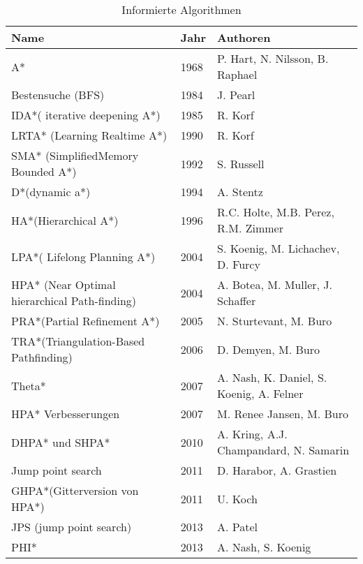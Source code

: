 \begin{table}[]
	\begin{tabular}{|l|l|l|}
		\hline
		\textbf{Name}                                          & \textbf{Jahr} & \textbf{Authoren}                                 \\ \hline
		A*                                            & 1968 & P. Hart, N. Nilsson, B. Raphael          \\ \hline
		Bestensuche (BFS)                            & 1984 & J. Pearl                                 \\ \hline
		IDA*( iterative deepening A*)                 & 1985 & R. Korf                                  \\ \hline
		LRTA* (Learning Realtime A*)                  & 1990 & R. Korf                                  \\ \hline
		SMA* (SimplifiedMemory Bounded A*)            & 1992 & S. Russell                               \\ \hline
		D*(dynamic a*)                                & 1994 & A. Stentz                                \\ \hline
		HA*(Hierarchical A*)                          & 1996 & R.C. Holte, M.B. Perez, R.M. Zimmer      \\ \hline
		LPA*( Lifelong Planning A*)                   & 2004 & S. Koenig, M. Lichachev, D. Furcy        \\ \hline
		HPA* (Near Optimal hierarchical Path-finding) & 2004 & A. Botea, M. Muller, J. Schaffer         \\ \hline
		PRA*(Partial Refinement A*)                   & 2005 & N. Sturtevant, M. Buro                   \\ \hline
		TRA*(Triangulation-Based Pathfinding)         & 2006 & D. Demyen, M. Buro                       \\ \hline
		Theta*                                        & 2007 & A. Nash, K. Daniel, S. Koenig, A. Felner \\ \hline
		HPA* Verbesserungen                           & 2007 & M. Renee Jansen, M. Buro                 \\ \hline
		DHPA* und SHPA*                               & 2010 & A. Kring, A.J. Champandard, N. Samarin   \\ \hline
		Jump point search                             & 2011 & D. Harabor, A. Grastien                  \\ \hline
		GHPA*(Gitterversion von HPA*)                 & 2011 & U. Koch                                  \\ \hline
		JPS (jump point search)                       & 2013 & A. Patel                                 \\ \hline
		PHI*                                          & 2013 & A. Nash, S. Koenig                       \\ \hline
	\end{tabular}
\caption{\label{tab:informed}Informierte Algorithmen}
\end{table}

